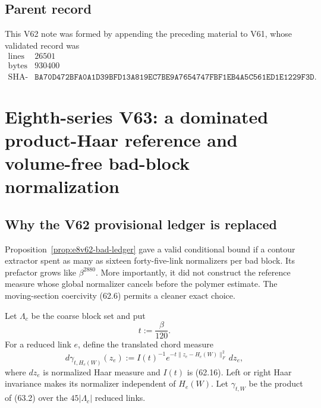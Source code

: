 \documentclass[11pt,oneside]{book}
\theoremstyle{definition}
\theoremstyle{remark}
\begin{document}
\subsection{Parent record}

This V62 note was formed by appending the preceding material to V61,
whose validated record was
\[
\begin{array}{c|c}
\text{lines}&26501\\
\text{bytes}&930400\\
\text{SHA-256}&
\texttt{BA70D472BFA0A1D39BFD13A819EC7BE9A7654747FBF1EB4A5C561ED1E1229F3D}.
\end{array}
\]



\section{Eighth-series V63: a dominated product-Haar reference and
volume-free bad-block normalization}
\label{sec:e8v63}

\subsection{Why the V62 provisional ledger is replaced}

Proposition~\ref{prop:e8v62-bad-ledger} gave a valid conditional
bound if a contour extractor spent as many as sixteen forty-five-link
normalizers per bad block.  Its prefactor grows like
\(\beta^{2880}\).  More importantly, it did not construct the
reference measure whose global normalizer cancels before the
polymer estimate.  The moving-section coercivity (62.6) permits a
cleaner exact choice.

Let \(\Lambda_c\) be the coarse block set and put
\[
                         t:=\frac\beta{120}.                  \tag{63.1}
\]
For a reduced link \(e\), define the translated chord measure
\[
 d\gamma_{t,H_e(W)}(z_e)
 :=I(t)^{-1}e^{-t\|z_e-H_e(W)\|_F^2}\,dz_e,                  \tag{63.2}
\]
where \(dz_e\) is normalized Haar measure and \(I(t)\) is (62.16).
Left or right Haar invariance makes its normalizer independent of
\(H_e(W)\).  Let \(\gamma_{t,W}\) be the product of (63.2) over
the \(45|\Lambda_c|\) reduced links.
\end{document}
